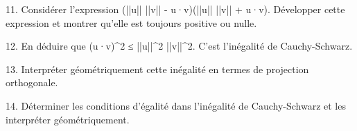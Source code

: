 \documentclass[10pt,a4paper]{article}
\begin{document}
11. Considérer l'expression (||u|| ||v|| - u·v)(||u|| ||v|| + u·v). Développer cette expression et montrer qu'elle est toujours positive ou nulle.

12. En déduire que (u·v)^2 ≤ ||u||^2 ||v||^2. C'est l'inégalité de Cauchy-Schwarz.

13. Interpréter géométriquement cette inégalité en termes de projection orthogonale.

14. Déterminer les conditions d'égalité dans l'inégalité de Cauchy-Schwarz et les interpréter géométriquement.
\end{document}
